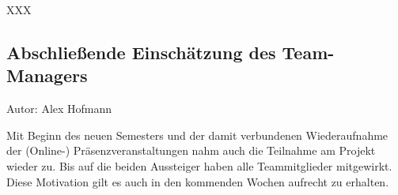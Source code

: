 XXX

\subsection{Abschließende Einschätzung des Team-Managers}
{\small Autor: Alex Hofmann}

Mit Beginn des neuen Semesters und der damit verbundenen Wiederaufnahme der (Online-) Präsenzveranstaltungen nahm auch die Teilnahme am Projekt wieder zu. Bis auf die beiden Aussteiger haben alle Teammitglieder mitgewirkt. Diese Motivation gilt es auch in den kommenden Wochen aufrecht zu erhalten.

